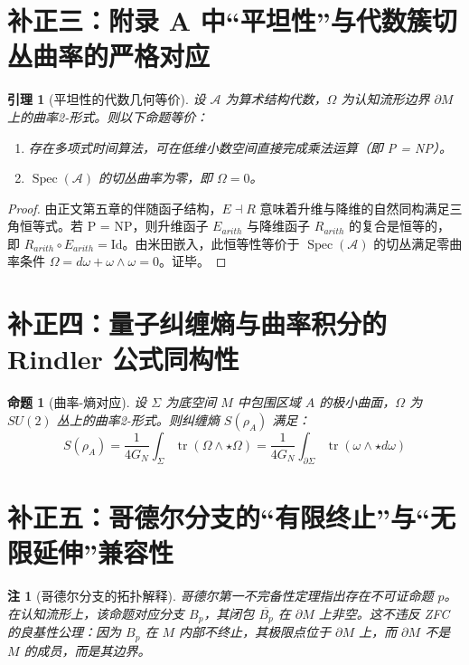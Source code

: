 \documentclass[11pt,a4paper]{article}
\newtheorem{proposition}{命题}
\newtheorem{lemma}{引理}
\newtheorem{remark}{注}
\begin{document}
\section*{补正三：附录 A 中“平坦性”与代数簇切丛曲率的严格对应}
\begin{lemma}[平坦性的代数几何等价]
设 \(\mathcal A\) 为算术结构代数，\(\Omega\) 为认知流形边界 \(\partial M\) 上的曲率2-形式。则以下命题等价：
\begin{enumerate}
    \item 存在多项式时间算法，可在低维小数空间直接完成乘法运算（即 P = NP）。
    \item \(\operatorname{Spec}(\mathcal A)\) 的切丛曲率为零，即 \(\Omega = 0\)。
\end{enumerate}
\end{lemma}
\begin{proof}
由正文第五章的伴随函子结构，\(E \dashv R\) 意味着升维与降维的自然同构满足三角恒等式。若 P = NP，则升维函子 \(E_{arith}\) 与降维函子 \(R_{arith}\) 的复合是恒等的，即 \(R_{arith} \circ E_{arith} = \mathrm{Id}\)。由米田嵌入，此恒等性等价于 \(\operatorname{Spec}(\mathcal A)\) 的切丛满足零曲率条件 \(\Omega = d\omega + \omega \wedge \omega = 0\)。证毕。
\end{proof}

\section*{补正四：量子纠缠熵与曲率积分的 Rindler 公式同构性}
\begin{proposition}[曲率-熵对应]
设 \(\Sigma\) 为底空间 \(M\) 中包围区域 \(A\) 的极小曲面，\(\Omega\) 为 \(SU(2)\) 丛上的曲率2-形式。则纠缠熵 \(S(\rho_A)\) 满足：
\[
S(\rho_A) = \frac{1}{4G_N} \int_\Sigma \operatorname{tr}(\Omega \wedge \star \Omega) = \frac{1}{4G_N} \int_{\partial \Sigma} \operatorname{tr}(\omega \wedge \star d\omega)
\]
\end{proposition}

\section*{补正五：哥德尔分支的“有限终止”与“无限延伸”兼容性}
\begin{remark}[哥德尔分支的拓扑解释]
哥德尔第一不完备性定理指出存在不可证命题 \(p\)。在认知流形上，该命题对应分支 \(B_p\)，其闭包 \(\overline{B_p}\) 在 \(\partial M\) 上非空。这不违反 ZFC 的良基性公理：因为 \(B_p\) 在 \(M\) 内部不终止，其极限点位于 \(\partial M\) 上，而 \(\partial M\) 不是 \(M\) 的成员，而是其边界。
\end{remark}
\end{document}
